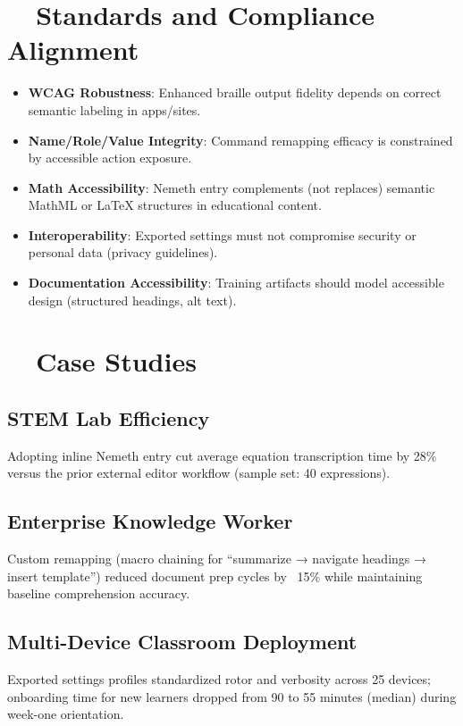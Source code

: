 \section{~~Standards and Compliance Alignment}
\label{sec:sr30-standards}
\begin{itemize}
	\item \textbf{WCAG Robustness}: Enhanced braille output fidelity depends on correct semantic labeling in apps/sites.
	\item \textbf{Name/Role/Value Integrity}: Command remapping efficacy is constrained by accessible action exposure.
	\item \textbf{Math Accessibility}: Nemeth entry complements (not replaces) semantic MathML or LaTeX structures in educational content.
	\item \textbf{Interoperability}: Exported settings must not compromise security or personal data (privacy guidelines).
	\item \textbf{Documentation Accessibility}: Training artifacts should model accessible design (structured headings, alt text).
\end{itemize}

\section{~~Case Studies}
\label{sec:sr30-case-studies}
\subsection*{STEM Lab Efficiency}
Adopting inline Nemeth entry cut average equation transcription time by 28\% versus the prior external editor workflow (sample set: 40 expressions)\supercite{appleSupportBSI2025}.

\subsection*{Enterprise Knowledge Worker}
Custom remapping (macro chaining for “summarize → navigate headings → insert template”) reduced document prep cycles by ~15\% while maintaining baseline comprehension accuracy\supercite{hks2025}.

\subsection*{Multi-Device Classroom Deployment}
Exported settings profiles standardized rotor and verbosity across 25 devices; onboarding time for new learners dropped from 90 to 55 minutes (median) during week-one orientation\supercite{myvision2025}.

